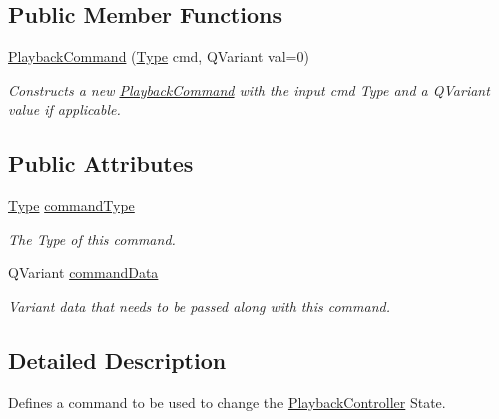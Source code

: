 \subsection*{Public Member Functions}
\begin{DoxyCompactItemize}
\item 
\hypertarget{struct_playback_command_a44078ead5e5309ea66ea6f541192ac86}{\hyperlink{struct_playback_command_a44078ead5e5309ea66ea6f541192ac86}{Playback\-Command} (\hyperlink{struct_playback_command_a6965fdf688457819423c37d4b7369b8e}{Type} cmd, Q\-Variant val=0)}\label{struct_playback_command_a44078ead5e5309ea66ea6f541192ac86}

\begin{DoxyCompactList}\small\item\em Constructs a new \hyperlink{struct_playback_command}{Playback\-Command} with the input cmd Type and a Q\-Variant value if applicable. \end{DoxyCompactList}\end{DoxyCompactItemize}
\subsection*{Public Attributes}
\begin{DoxyCompactItemize}
\item 
\hypertarget{struct_playback_command_a6545618f1f4f7c5c5c0aceeafe6a4e7d}{\hyperlink{struct_playback_command_a6965fdf688457819423c37d4b7369b8e}{Type} \hyperlink{struct_playback_command_a6545618f1f4f7c5c5c0aceeafe6a4e7d}{command\-Type}}\label{struct_playback_command_a6545618f1f4f7c5c5c0aceeafe6a4e7d}

\begin{DoxyCompactList}\small\item\em The Type of this command. \end{DoxyCompactList}\item 
\hypertarget{struct_playback_command_a3e930693f360986b843d16c0f97b73f1}{Q\-Variant \hyperlink{struct_playback_command_a3e930693f360986b843d16c0f97b73f1}{command\-Data}}\label{struct_playback_command_a3e930693f360986b843d16c0f97b73f1}

\begin{DoxyCompactList}\small\item\em Variant data that needs to be passed along with this command. \end{DoxyCompactList}\end{DoxyCompactItemize}


\subsection{Detailed Description}
Defines a command to be used to change the \hyperlink{class_playback_controller}{Playback\-Controller} State. 

